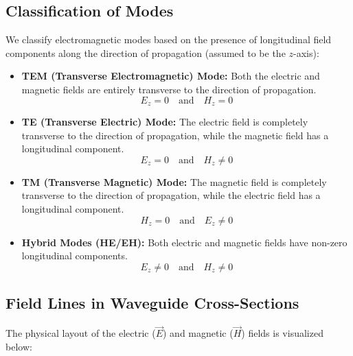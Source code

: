 \documentclass[12pt,a4paper]{article}
\begin{document}
\subsection{Classification of Modes}
We classify electromagnetic modes based on the presence of longitudinal field components along the direction of propagation (assumed to be the $z$-axis):
\begin{itemize}[leftmargin=*, itemsep=3pt]
  \item \textbf{TEM (Transverse Electromagnetic) Mode:}
    Both the electric and magnetic fields are entirely transverse to the direction of propagation.
    \begin{equation}
      E_z = 0 \quad \text{and} \quad H_z = 0
    \end{equation}
  \item \textbf{TE (Transverse Electric) Mode:}
    The electric field is completely transverse to the direction of propagation, while the magnetic field has a longitudinal component.
    \begin{equation}
      E_z = 0 \quad \text{and} \quad H_z \ne 0
    \end{equation}
  \item \textbf{TM (Transverse Magnetic) Mode:}
    The magnetic field is completely transverse to the direction of propagation, while the electric field has a longitudinal component.
    \begin{equation}
      H_z = 0 \quad \text{and} \quad E_z \ne 0
    \end{equation}
  \item \textbf{Hybrid Modes (HE/EH):}
    Both electric and magnetic fields have non-zero longitudinal components.
    \begin{equation}
      E_z \ne 0 \quad \text{and} \quad H_z \ne 0
    \end{equation}
\end{itemize}

\subsection{Field Lines in Waveguide Cross-Sections}
The physical layout of the electric ($\vec{E}$) and magnetic ($\vec{H}$) fields is visualized below:
\end{document}
